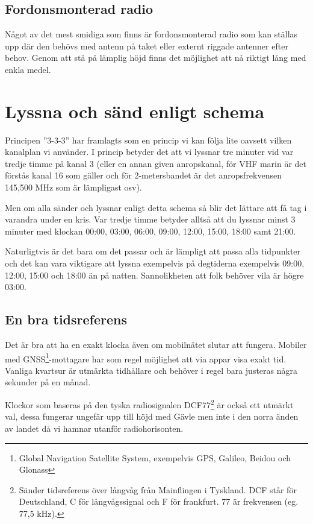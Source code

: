 \subsection{Fordonsmonterad radio}

Något av det mest smidiga som finns är fordonsmonterad radio som kan ställas
upp där den behövs med antenn på taket eller externt riggade antenner efter
behov. Genom att stå på lämplig höjd finns det möjlighet att nå riktigt lång
med enkla medel.

\section{Lyssna och sänd enligt schema}

Principen ''3-3-3'' har framlagts som en princip vi kan följa lite oavsett vilken
kanalplan vi använder. I princip betyder det att vi lyssnar tre minuter vid
var tredje timme på kanal 3 (eller en annan given anropskanal, för VHF marin
är det förstås kanal 16 som gäller och för 2-metersbandet är det
anropsfrekvensen 145,500 MHz som är lämpligast osv).

Men om alla sänder och lyssnar enligt detta schema så blir det lättare att få
tag i varandra under en kris. Var tredje timme betyder alltså att du lyssnar
minst 3 minuter med klockan 00:00, 03:00, 06:00, 09:00, 12:00, 15:00, 18:00
samt 21:00.

Naturligtvis är det bara om det passar och är lämpligt att passa alla
tidpunkter och det kan vara viktigare att lyssna exempelvis på degtiderna
exempelvis 09:00, 12:00, 15:00 och 18:00 än på natten. Sannolikheten att folk
behöver vila är högre 03:00.

\subsection{En bra tidsreferens}

Det är bra att ha en exakt klocka även om mobilnätet slutar att fungera.
Mobiler med GNSS\footnote{Global Navigation Satellite System, exempelvis GPS,
Galileo, Beidou och Glonass}-mottagare har som regel möjlighet att via appar
visa exakt tid. Vanliga kvartsur är utmärkta tidhållare och behöver i regel
bara justeras några sekunder på en månad.

Klockor som baseras på den tyska radiosignalen DCF77\footnote{Sänder
tidsreferens över långvåg från Mainflingen i Tyskland. DCF står för
Deutschland, C för långvågssignal och F för frankfurt. 77 är frekvensen (eg.
77,5 kHz).} är också ett utmärkt val, dessa fungerar ungefär upp till höjd med
Gävle men inte i den norra änden av landet då vi hamnar utanför
radiohorisonten.

